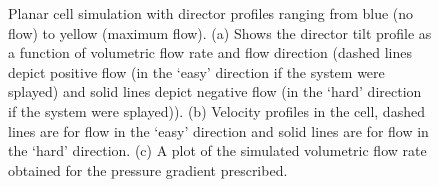 \begin{figure}
\begin{center}
\end{center}
\caption[Simulated tilt, velocity and pressure gradients for a planar cell]{\label{fig:diode_planar}Planar cell simulation with director profiles ranging from blue (no flow) to yellow (maximum flow). (a) Shows the director tilt profile as a function of volumetric flow rate and flow direction (dashed lines depict positive flow (in the `easy' direction if the system were splayed) and solid lines depict negative flow (in the `hard' direction if the system were splayed)). (b) Velocity profiles in the cell, dashed lines are for flow in the `easy' direction and solid lines are for flow in the `hard' direction. (c) A plot of the simulated volumetric flow rate obtained for the pressure gradient prescribed.}
\end{figure}

